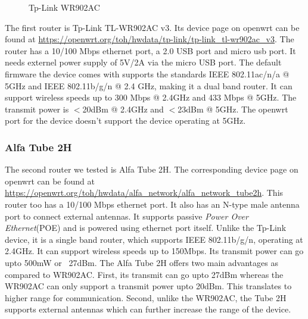 \begin{figure}[h]
\begin{subfigure}{0.5\textwidth}
	\end{subfigure}
	\caption{Tp-Link WR902AC}
	\label{fig: tplink}
\end{figure}

The first router is Tp-Link TL-WR902AC v3. Its device page on openwrt can be found at \url{https://openwrt.org/toh/hwdata/tp-link/tp-link_tl-wr902ac_v3}. The router has a 10/100 Mbps ethernet port, a 2.0 USB port and micro usb port. It needs externel power supply of 5V/2A via the micro 
USB port. The default firmware the device comes with supports the standards IEEE 802.11ac/n/a @ 5GHz and IEEE 802.11b/g/n @ 2.4 GHz, making it a dual band router. It can support wireless speeds up to 300 Mbps @ 2.4GHz and 433 Mbps @ 5GHz. The transmit power is $<$20dBm @ 2.4GHz and $<$23dBm @ 5GHz. The openwrt port for the device doesn't support the device operating at 5GHz.

\subsubsection{Alfa Tube 2H}
The second router we tested is Alfa Tube 2H. The corresponding device page on openwrt can be found at \url{https://openwrt.org/toh/hwdata/alfa_network/alfa_network_tube2h}. This router too has a 10/100 Mbps ethernet port. It also has an N-type male antenna port to connect external antennas. It supports passive \textit{Power Over Ethernet}(POE) and is powered using ethernet port itself. Unlike the Tp-Link device, it is a single band router, which supports IEEE 802.11b/g/n, operating at 2.4GHz. It can support wireless speeds up to 150Mbps. Its transmit power can go upto 500mW or ~27dBm. The Alfa Tube 2H offers two main advantages as compared to WR902AC. First, its transmit can go upto 27dBm whereas the WR902AC can only support a transmit power upto 20dBm. This translates to higher range for communication. Second, unlike the WR902AC, the Tube 2H supports external antennas which can further increase the range of the device.

